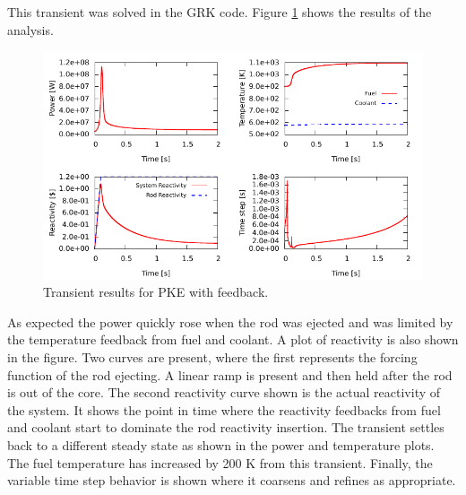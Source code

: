 \documentclass{ansconf}
\numberwithin{equation}{section}
\begin{document}
This transient was solved in the GRK code. Figure \ref{fig:pk_feedback_all} shows the results of the analysis.
\begin{figure} 
\centering \includegraphics[scale=1.00]{./figs/pk_feedback_all.pdf}
\caption{Transient results for PKE with feedback.}
\label{fig:pk_feedback_all}
\end{figure}
As expected the power quickly rose when the rod was ejected and was limited by the temperature feedback from fuel and coolant. A plot of reactivity is also shown in the figure. Two curves are present, where the first represents the forcing function of the rod ejecting. A linear ramp is present and then held after the rod is out of the core. The second reactivity curve shown is the actual reactivity of the system.  It shows the point in time where the reactivity feedbacks from fuel and coolant start to dominate the rod reactivity insertion. The transient settles back to a different steady state as shown in the power and temperature plots.  The fuel temperature has increased by 200 K from this transient.  Finally, the variable time step behavior is shown where it coarsens and refines as appropriate.
\end{document}
